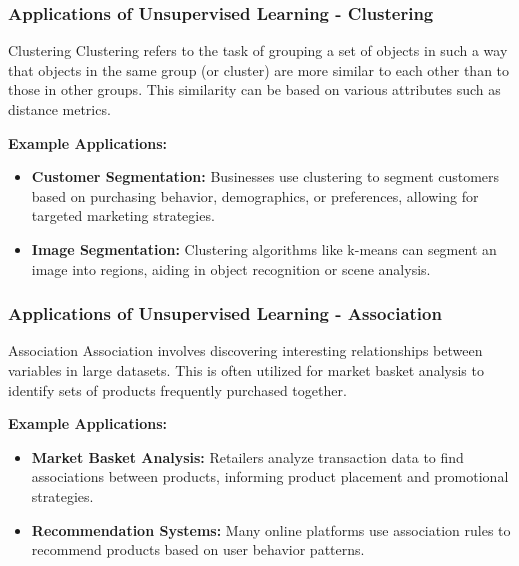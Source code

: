 \documentclass[aspectratio=169]{beamer}
\begin{document}
\begin{frame}[fragile]
  \frametitle{Applications of Unsupervised Learning - Clustering}
  \begin{block}{Clustering}
    Clustering refers to the task of grouping a set of objects in such a way that objects in the same group (or cluster) are more similar to each other than to those in other groups. This similarity can be based on various attributes such as distance metrics.
  \end{block}
  
  \textbf{Example Applications:}
  \begin{itemize}
    \item \textbf{Customer Segmentation:} Businesses use clustering to segment customers based on purchasing behavior, demographics, or preferences, allowing for targeted marketing strategies.
    \item \textbf{Image Segmentation:} Clustering algorithms like k-means can segment an image into regions, aiding in object recognition or scene analysis.
  \end{itemize}
\end{frame}

\begin{frame}[fragile]
  \frametitle{Applications of Unsupervised Learning - Association}
  \begin{block}{Association}
    Association involves discovering interesting relationships between variables in large datasets. This is often utilized for market basket analysis to identify sets of products frequently purchased together.
  \end{block}
  
  \textbf{Example Applications:}
  \begin{itemize}
    \item \textbf{Market Basket Analysis:} Retailers analyze transaction data to find associations between products, informing product placement and promotional strategies.
    \item \textbf{Recommendation Systems:} Many online platforms use association rules to recommend products based on user behavior patterns.
  \end{itemize}
\end{frame}
\end{document}
